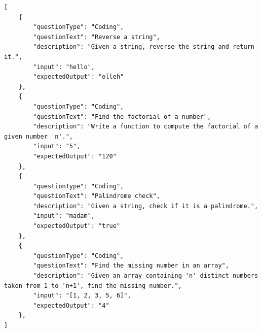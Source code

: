 \begin{lstlisting}[style=csharpstyle]
[
    {
        "questionType": "Coding",
        "questionText": "Reverse a string",
        "description": "Given a string, reverse the string and return it.",
        "input": "hello",
        "expectedOutput": "olleh"
    },
    {
        "questionType": "Coding",
        "questionText": "Find the factorial of a number",
        "description": "Write a function to compute the factorial of a given number 'n'.",
        "input": "5",
        "expectedOutput": "120"
    },
    {
        "questionType": "Coding",
        "questionText": "Palindrome check",
        "description": "Given a string, check if it is a palindrome.",
        "input": "madam",
        "expectedOutput": "true"
    },
    {
        "questionType": "Coding",
        "questionText": "Find the missing number in an array",
        "description": "Given an array containing 'n' distinct numbers taken from 1 to 'n+1', find the missing number.",
        "input": "[1, 2, 3, 5, 6]",
        "expectedOutput": "4"
    },
]
\end{lstlisting}



